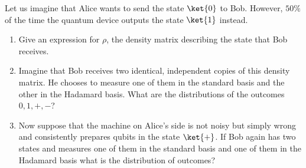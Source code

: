 \begin{exercises}
Let us imagine that Alice wants to send the state $\ket{0}$ to Bob. However, $50\%$ of the time the quantum device outputs the state $\ket{1}$ instead. 
\begin{enumerate}
\item Give an expression for $\rho$, the density matrix describing the state that Bob receives.
\item Imagine that Bob receives two identical, independent copies of this density matrix. He chooses to measure one of them in the standard basis and the other in the Hadamard basis. What are the distributions of the outcomes $0,1,+,-$?
\item Now suppose that the machine on Alice's side is not noisy but simply wrong and consistently prepares qubits in the state $\ket{+}$. If Bob again has two states and measures one of them in the standard basis and one of them in the Hadamard basis what is the distribution of  outcomes?

\end{enumerate}
\end{exercises}
